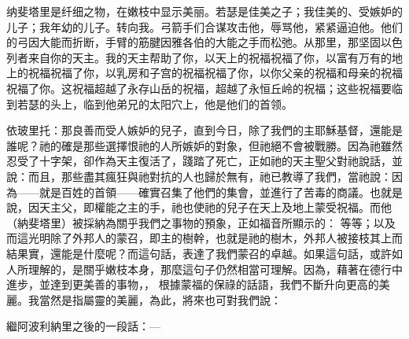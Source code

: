 纳斐塔里是纤细之物，在嫩枝中显示美丽。若瑟是佳美之子；我佳美的、受嫉妒的儿子；我年幼的儿子。转向我。弓箭手们合谋攻击他，辱骂他，紧紧逼迫他。他们的弓因大能而折断，手臂的筋腱因雅各伯的大能之手而松弛。从那里，那坚固以色列者来自你的天主。我的天主帮助了你，以天上的祝福祝福了你，以富有万有的地上的祝福祝福了你，以乳房和子宫的祝福祝福了你，以你父亲的祝福和母亲的祝福祝福了你。这祝福超越了永存山岳的祝福，超越了永恒丘岭的祝福；这些祝福要临到若瑟的头上，临到他弟兄的太阳穴上，他是他们的首领。\par

依玻里托：那良善而受人嫉妒的兒子，直到今日，除了我們的主耶穌基督，還能是誰呢？祂的確是那些選擇恨祂的人所嫉妒的對象，但祂絕不會被戰勝。因為祂雖然忍受了十字架，卻作為天主復活了，踐踏了死亡，正如祂的天主聖父對祂說話，並說：而且，那些盡其瘋狂與祂對抗的人也歸於無有，祂已教導了我們，當祂說：因為——就是百姓的首領——確實召集了他們的集會，並進行了苦毒的商議。也就是說，因天主父，即權能之主的手，祂也使祂的兒子在天上及地上蒙受祝福。而他（納斐塔里）被採納為關乎我們之事物的預象，正如福音所顯示的：  等等；以及  而這光明除了外邦人的蒙召，即主的樹幹，也就是祂的樹木，外邦人被接枝其上而結果實，還能是什麼呢？而這句話，表達了我們蒙召的卓越。如果這句話，或許如人所理解的，是關乎嫩枝本身，那麼這句子仍然相當可理解。因為，藉著在德行中進步，並達到更美善的事物，， 根據蒙福的保祿的話語，我們不斷升向更高的美麗。我當然是指屬靈的美麗，為此，將來也可對我們說：\par

繼阿波利納里之後的一段話：—\par

